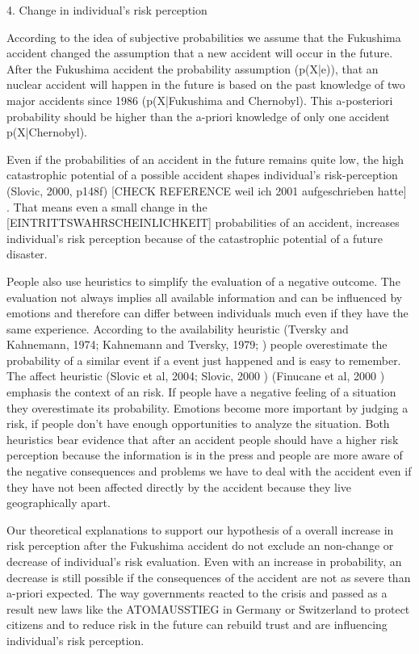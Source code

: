 4. Change in individual's risk perception

 According to the idea of subjective probabilities we assume that the Fukushima accident changed the assumption that a new accident will occur in the future. After the Fukushima accident the probability assumption (p(X|e)), that an nuclear accident will happen in the future is based on the past knowledge of two major accidents since 1986 (p(X|Fukushima and Chernobyl). This a-posteriori probability should be higher than the a-priori knowledge of only one accident p(X|Chernobyl).    

Even if the probabilities of an accident in the future remains quite low, the high catastrophic potential  of a possible accident shapes individual's risk-perception (Slovic, 2000, p148f) [CHECK REFERENCE weil ich 2001 aufgeschrieben hatte]   \citep[148]{Slovic:2000tx}. That means even a small change in the [EINTRITTSWAHRSCHEINLICHKEIT] probabilities of an accident, increases individual's risk perception because of the catastrophic potential of a future disaster. 

People also use heuristics to simplify the evaluation of a negative outcome. The evaluation not always implies all available information and can be influenced by emotions and therefore can differ between individuals much even if they have the same experience. According to the availability heuristic  (Tversky and Kahnemann, 1974; Kahnemann and Tversky, 1979; \citep{Tversky:1974wi,Tversky:1973ui, kahnemann_prospect_1979}) people overestimate the probability of a similar event if a event just happened and is easy to remember. The affect heuristic  (Slovic et al, 2004; Slovic, 2000 \citep{Slovic:2004hj}\citep{Slovic:2000tx}) (Finucane et al, 2000 \citep{Finucane:2000wu}) emphasis the context of an risk. If people have a negative feeling of a situation they overestimate its probability. Emotions become more important by judging a risk, if people don't have enough opportunities to analyze the situation. Both heuristics bear evidence that after an accident people should have a higher risk perception because the information is in the press and people are more aware of the negative consequences and problems we have to deal with the accident even if they have not been affected directly by the accident because they live geographically apart.  

Our theoretical explanations to support our hypothesis of a overall increase in risk perception after the Fukushima accident do not exclude an non-change or decrease of individual's risk evaluation. Even with an increase in probability, an decrease is still possible if the consequences of the accident are not as severe than a-priori expected. The way governments reacted to the crisis and passed as a result new laws like the ATOMAUSSTIEG in Germany or Switzerland to protect citizens and to reduce risk in the future can rebuild trust and are influencing individual's risk perception.        

